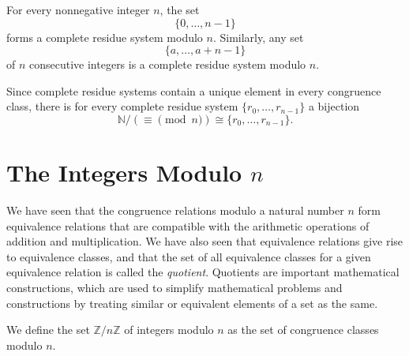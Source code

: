 \begin{example}
  For every nonnegative integer $n$, the set
  \begin{equation*}
    \{0,\ldots,n-1\}
  \end{equation*}
  forms a complete residue system modulo $n$. Similarly, any set
  \begin{equation*}
    \{a,\ldots,a+n-1\}
  \end{equation*}
  of $n$ consecutive integers is a complete residue system modulo $n$.
\end{example}

\begin{remark}
  Since complete residue systems contain a unique element in every congruence class, there is for every complete residue system $\{r_0,\ldots,r_{n-1}\}$ a bijection
  \begin{equation*}
    \mathbb{N}/{({\equiv}\pmod{n})} \cong \{r_0,\ldots,r_{n-1}\}.
  \end{equation*}
\end{remark}

\section{The Integers Modulo \texorpdfstring{$n$}{n}}

We have seen that the congruence relations modulo a natural number $n$ form equivalence relations that are compatible with the arithmetic operations of addition and multiplication. We have also seen that equivalence relations give rise to equivalence classes, and that the set of all equivalence classes for a given equivalence relation is called the \emph{quotient}. Quotients are important mathematical constructions, which are used to simplify mathematical problems and constructions by treating similar or equivalent elements of a set as the same.

\begin{definition}
  We define the set $\mathbb{Z}/n\mathbb{Z}$ of integers modulo $n$ as the set of congruence classes modulo $n$.
\end{definition}

